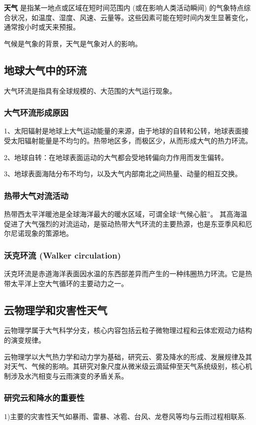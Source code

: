 \documentclass[12pt,a4paper]{article}
\begin{document}
	\textbf{天气} 是指某一地点或区域在短时间范围内 (或在影响人类活动瞬间) 的气象特点综合状况，如温度、湿度、风速、云量等。这些因素可能在短时间内发生显著变化，通常按小时或天来预报。
	
	气候是气象的背景，天气是气象对人的影响。
	
	\subsection{地球大气中的环流}
	
	大气环流是指具有全球规模的、大范围的大气运行现象。
	
	\subsubsection{大气环流形成原因}
	1、太阳辐射是地球上大气运动能量的来源，由于地球的自转和公转，地球表面接受太阳辐射能量是不均匀的。热带地区多，而极区少，从而形成大气的热力环流。
	
	2、地球自转：在地球表面运动的大气都会受地转偏向力作用而发生偏转。
	
	3、地球表面海陆分布不均匀，以及大气内部南北之间热量、动量的相互交换。
	
	\subsubsection{热带大气对流活动}
	热带西太平洋暖池是全球海洋最大的暖水区域，可谓全球“气候心脏”。 其高海温促进了大气强烈的对流运动，是驱动热带大气环流的主要热源，也是东亚季风和厄尔尼诺现象的策源地。
	
	\subsubsection{沃克环流 (Walker circulation)}
	沃克环流是赤道海洋表面因水温的东西部差异而产生的一种纬圈热力环流。它是热带太平洋上空大气循环的主要动力之一。
	\subsection{云物理学和灾害性天气}
	云物理学属于大气科学分支，核心内容包括云粒子微物理过程和云体宏观动力结构的演变规律。
	
	云物理学以大气热力学和动力学为基础，研究云、雾及降水的形成、发展规律及其对天气、气候的影响。其研究对象尺度从微米级云滴延伸至天气系统级别，核心机制涉及水汽相变与云雨演变的矛盾关系。
	
	\subsubsection{研究云和降水的重要性}
	1)主要的灾害性天气如暴雨、雷暴、冰雹、台风、龙卷风等均与云雨过程相联系.
	
\end{document}
